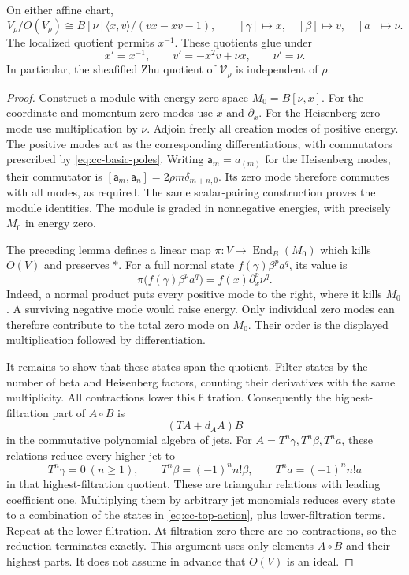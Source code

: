 \begin{theorem}\label{thm:cc-zhu}
On either affine chart,
\[
 V_\rho/O(V_\rho)\cong
 B[\nu]\langle x,v\rangle/(vx-xv-1),
 \qquad [\gamma]\mapsto x,\quad[\beta]\mapsto v,\quad[a]\mapsto\nu.
\]
The localized quotient permits $x^{-1}$.
These quotients glue under
\[
 x'=x^{-1},\qquad v'=-x^2v+\nu x,\qquad \nu'=\nu.
\]
In particular, the sheafified Zhu quotient of $\mathcal V_\rho$ is independent of $\rho$.
\end{theorem}
\begin{proof}
Construct a module with energy-zero space $M_0=B[\nu,x]$.
For the coordinate and momentum zero modes use $x$ and $\partial_x$.
For the Heisenberg zero mode use multiplication by $\nu$.
Adjoin freely all creation modes of positive energy.
The positive modes act as the corresponding differentiations, with commutators prescribed by \eqref{eq:cc-basic-poles}.
Writing $\mathsf a_m=a_{(m)}$ for the Heisenberg modes, their commutator is
$[\mathsf a_m,\mathsf a_n]=2\rho m\delta_{m+n,0}$.
Its zero mode therefore commutes with all modes, as required.
The same scalar-pairing construction proves the module identities.
The module is graded in nonnegative energies, with precisely $M_0$ in energy zero.

The preceding lemma defines a linear map $\pi:V\to\operatorname{End}_B(M_0)$ which kills $O(V)$ and preserves $*$.
For a full normal state $f(\gamma)\beta^p a^q$, its value is
\begin{equation}\label{eq:cc-top-action}
 \pi\bigl(f(\gamma)\beta^p a^q\bigr)
       =f(x)\partial_x^p\nu^q.
\end{equation}
Indeed, a normal product puts every positive mode to the right, where it kills $M_0$.
A surviving negative mode would raise energy.
Only individual zero modes can therefore contribute to the total zero mode on $M_0$.
Their order is the displayed multiplication followed by differentiation.

It remains to show that these states span the quotient.
Filter states by the number of beta and Heisenberg factors, counting their derivatives with the same multiplicity.
All contractions lower this filtration.
Consequently the highest-filtration part of $A\circ B$ is
\[
 (TA+d_AA)B
\]
in the commutative polynomial algebra of jets.
For $A=T^n\gamma,T^n\beta,T^na$, these relations reduce every higher jet to
\[
 T^n\gamma=0\ (n\geq1),\qquad
 T^n\beta=(-1)^n n!\beta,\qquad
 T^na=(-1)^n n!a
\]
in that highest-filtration quotient.
These are triangular relations with leading coefficient one.
Multiplying them by arbitrary jet monomials reduces every state to a combination of the states in \eqref{eq:cc-top-action}, plus lower-filtration terms.
Repeat at the lower filtration.
At filtration zero there are no contractions, so the reduction terminates exactly.
This argument uses only elements $A\circ B$ and their highest parts.
It does not assume in advance that $O(V)$ is an ideal.


\end{proof}
